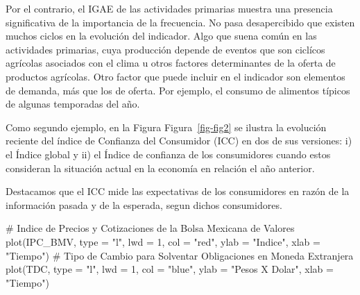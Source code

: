 \documentclass[
  a4paper,
]{article}
\newenvironment{Shaded}{}{}
\newcommand{\AttributeTok}[1]{\textcolor[rgb]{0.84,0.23,0.29}{#1}}
\newcommand{\CommentTok}[1]{\textcolor[rgb]{0.42,0.45,0.49}{#1}}
\newcommand{\DecValTok}[1]{\textcolor[rgb]{0.00,0.36,0.77}{#1}}
\newcommand{\FunctionTok}[1]{\textcolor[rgb]{0.44,0.26,0.76}{#1}}
\newcommand{\NormalTok}[1]{\textcolor[rgb]{0.14,0.16,0.18}{#1}}
\newcommand{\StringTok}[1]{\textcolor[rgb]{0.01,0.18,0.38}{#1}}
\begin{document}
Por el contrario, el IGAE de las actividades primarias muestra una
presencia significativa de la importancia de la frecuencia. No pasa
desapercibido que existen muchos ciclos en la evolución del indicador.
Algo que suena común en las actividades primarias, cuya producción
depende de eventos que son ciclícos agrícolas asociados con el clima u
otros factores determinantes de la oferta de productos agrícolas. Otro
factor que puede incluir en el indicador son elementos de demanda, más
que los de oferta. Por ejemplo, el consumo de alimentos típicos de
algunas temporadas del año.

Como segundo ejemplo, en la Figura Figura~\ref{fig-fig2} se ilustra la
evolución reciente del índice de Confianza del Consumidor (ICC) en dos
de sus versiones: i) el Índice global y ii) el Índice de confianza de
los consumidores cuando estos consideran la situación actual en la
economía en relación el año anterior.

Destacamos que el ICC mide las expectativas de los consumidores en razón
de la información pasada y de la esperada, segun dichos consumidores.

\begin{Shaded}
\begin{Highlighting}[]
\CommentTok{\# Indice de Precios y Cotizaciones de la Bolsa Mexicana de Valores}
\FunctionTok{plot}\NormalTok{(IPC\_BMV, }\AttributeTok{type =} \StringTok{"l"}\NormalTok{, }\AttributeTok{lwd =} \DecValTok{1}\NormalTok{, }\AttributeTok{col =} \StringTok{"red"}\NormalTok{, }\AttributeTok{ylab =} \StringTok{"Indice"}\NormalTok{, }\AttributeTok{xlab =} \StringTok{"Tiempo"}\NormalTok{)}
\CommentTok{\# Tipo de Cambio para Solventar Obligaciones en Moneda Extranjera}
\FunctionTok{plot}\NormalTok{(TDC, }\AttributeTok{type =} \StringTok{"l"}\NormalTok{, }\AttributeTok{lwd =} \DecValTok{1}\NormalTok{, }\AttributeTok{col =} \StringTok{"blue"}\NormalTok{, }\AttributeTok{ylab =} \StringTok{"Pesos X Dolar"}\NormalTok{, }\AttributeTok{xlab =} \StringTok{"Tiempo"}\NormalTok{)}
\end{Highlighting}
\end{Shaded}
\end{document}

